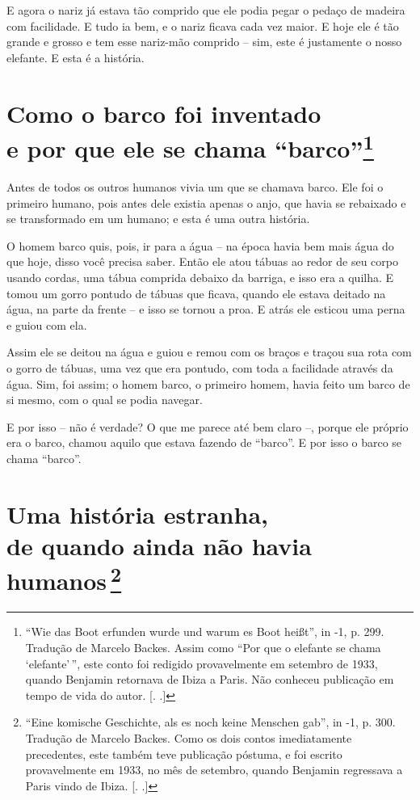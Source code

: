 E agora o nariz já estava tão comprido que ele podia pegar o pedaço de
madeira com facilidade. E tudo ia bem, e o nariz ficava cada vez maior.
E hoje ele é tão grande e grosso e tem esse nariz-mão comprido -- sim,
este é justamente o nosso elefante. E esta é a história.

\chapter{Como o barco foi inventado \\e por que ele se chama ``barco''\footnote[*]{``Wie
  das Boot erfunden wurde und warum es Boot heißt'', in  -1, p.
  299. Tradução de Marcelo Backes. Assim como ``Por que o elefante se
      chama `elefante'\,'', este conto foi redigido provavelmente em setembro
  de 1933, quando Benjamin retornava de Ibiza a Paris. Não conheceu
  publicação em tempo de vida do autor. [. .]} }

Antes de todos os outros humanos vivia um que se chamava barco. Ele foi
o primeiro humano, pois antes dele existia apenas o anjo, que havia se
rebaixado e se transformado em um humano; e esta é uma outra história.

O homem barco quis, pois, ir para a água -- na época havia bem mais água
do que hoje, disso você precisa saber. Então ele atou tábuas ao redor de
seu corpo usando cordas, uma tábua comprida debaixo da barriga, e isso
era a quilha. E tomou um gorro pontudo de tábuas que ficava, quando ele
estava deitado na água, na parte da frente -- e isso se tornou a proa. E
atrás ele esticou uma perna e guiou com ela.

Assim ele se deitou na água e guiou e remou com os braços e traçou sua
rota com o gorro de tábuas, uma vez que era pontudo, com toda a
facilidade através da água. Sim, foi assim; o homem barco, o primeiro
homem, havia feito um barco de si mesmo, com o qual se podia navegar.

E por isso -- não é verdade? O que me parece até bem claro --, porque
ele próprio era o barco, chamou aquilo que estava fazendo de ``barco''.
E por isso o barco se chama ``barco''.

\chapter{Uma história estranha, \\de quando ainda não havia humanos\,\footnote[*]{``Eine komische Geschichte, als es noch keine
  Menschen gab'', in  -1, p. 300. Tradução de Marcelo Backes. Como
  os dois contos imediatamente precedentes, este também teve publicação
  póstuma, e foi escrito provavelmente em 1933, no mês de setembro,
  quando Benjamin regressava a Paris vindo de Ibiza. [. .]} }


